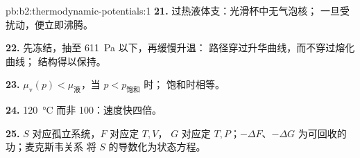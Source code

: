 \begin{solution}{pb:b2:thermodynamic-potentials:1}
\textbf{21.} 过热液体支：光滑杯中无气泡核；
一旦受扰动，便立即沸腾。

\textbf{22.} 先冻结，抽至 \qty{611}{Pa} 以下，再缓慢升温：
路径穿过升华曲线，而不穿过熔化曲线；
结构得以保持。

\textbf{23.} $\mu_{\text{v}}(p) < \mu_{\text{液}}$，当 $p < p_{\text{饱和}}$ 时；
饱和时相等。

\textbf{24.} \qty{120}{\celsius} 而非 \qty{100}{}：速度快四倍。

\textbf{25.} $S$ 对应孤立系统，$F$ 对应定 $T,V$，
$G$ 对应定 $T,P$；$-\Delta F$、$-\Delta G$ 为可回收的功；麦克斯韦关系
将 $S$ 的导数化为状态方程。
\end{solution}
